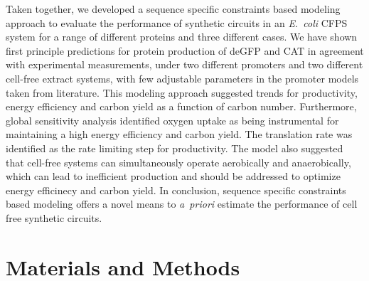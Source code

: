 \documentclass[journal=asbcd6,manuscript=article]{achemso}
\begin{document}
Taken together, we developed a sequence specific constraints based modeling approach to evaluate the performance of synthetic circuits in an \emph{E.~coli} CFPS system for a range of different proteins and three different cases.
We have shown first principle predictions for protein production of deGFP and CAT in agreement with experimental measurements, under two different promoters and two different cell-free extract systems, with few adjustable parameters in the promoter models taken from literature.
This modeling approach suggested trends for productivity, energy efficiency and carbon yield as a function of carbon number.
Furthermore, global sensitivity analysis identified oxygen uptake as being instrumental for maintaining a high energy efficiency and carbon yield.
The translation rate was identified as the rate limiting step for productivity.
The model also suggested that cell-free systems can simultaneously operate aerobically and anaerobically, which can lead to inefficient production and should be addressed to optimize energy efficinecy and carbon yield.
In conclusion, sequence specific constraints based modeling offers a novel means to \emph{a~priori} estimate the performance of cell free synthetic circuits.

\section*{Materials and Methods}
\end{document}
